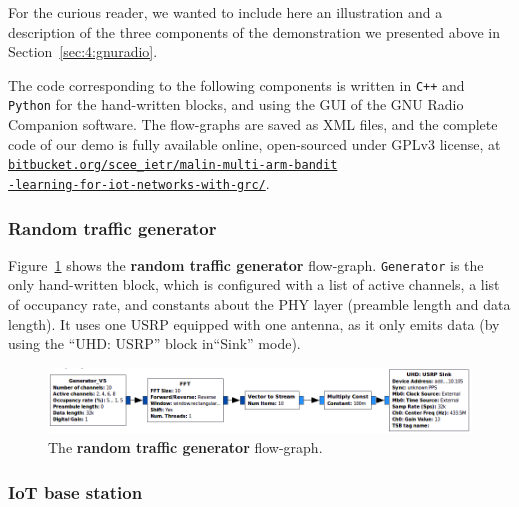 For the curious reader, we wanted to include here an illustration and a description of the three components of the demonstration we presented above in Section~\ref{sec:4:gnuradio}.

The code corresponding to the following components is written in \texttt{C++} and \texttt{Python} for the hand-written blocks, and using the GUI of the GNU Radio Companion software.
The flow-graphs are saved as XML files, and the complete code of our demo is fully available online, open-sourced under GPLv3 license, at
\href{https://bitbucket.org/scee_ietr/malin-multi-arm-bandit-learning-for-iot-networks-with-grc}{\texttt{bitbucket.org/scee\_ietr/malin-multi-arm-bandit}\\\texttt{-learning-for-iot-networks-with-grc/}}.

\subsubsection*{Random traffic generator}

Figure~\ref{fig:4app:USRP_TX_PU__v1__simple_grc} shows the \textbf{random traffic generator} flow-graph.
\texttt{Generator} is the only hand-written block, which is configured with a list of active channels, a list of occupancy rate, and constants about the PHY layer (preamble length and data length).
It uses one USRP equipped with one antenna, as it only emits data (by using the ``UHD: USRP'' block in``Sink'' mode).

\begin{figure}[!h]
    \includegraphics[width=1.02\textwidth]{2-Chapters/4-Chapter/Images/USRP_TX_PU__v1__simple_grc.png}
    \caption{The \textbf{random traffic generator} flow-graph.}
    \label{fig:4app:USRP_TX_PU__v1__simple_grc}
\end{figure}


\subsubsection*{IoT base station}

